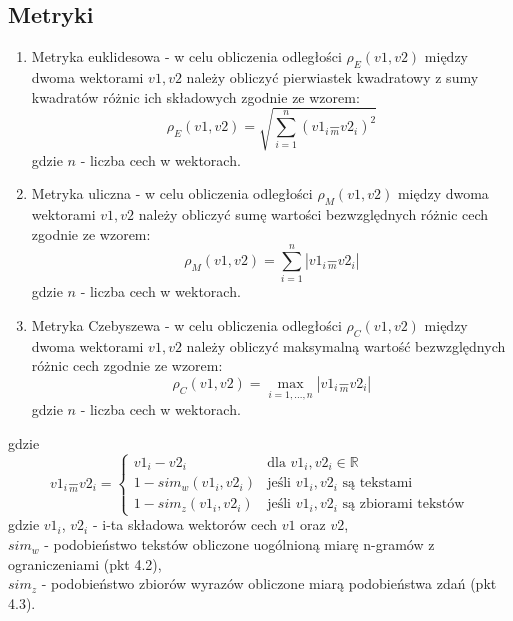\documentclass{article}
\begin{document}
\subsection{Metryki}
\begin{enumerate}
    \item Metryka euklidesowa - w celu obliczenia odległości \(\rho_E(v1, v2)\) między dwoma wektorami \(v1, v2\) należy obliczyć pierwiastek kwadratowy z sumy kwadratów różnic ich składowych zgodnie ze wzorem:
        \begin{equation}
      \rho_E(v1, v2) = \sqrt{\sum_{i=1}^{n} (v1_i \underset{m}{-} v2_i)^2}  
        \end{equation}
        gdzie \(n\) - liczba cech w wektorach.
        
    \item Metryka uliczna - w celu obliczenia odległości \(\rho_M(v1, v2)\) między dwoma wektorami \(v1, v2\) należy obliczyć sumę wartości bezwzględnych różnic cech zgodnie ze wzorem:
        \begin{equation}
          \rho_M(v1, v2) = \sum_{i=1}^{n} |v1_i \underset{m}{-} v2_i|
        \end{equation}
        gdzie \(n\) - liczba cech w wektorach.
        
    \item Metryka Czebyszewa - w celu obliczenia odległości \(\rho_C(v1, v2)\) między dwoma wektorami \(v1, v2\) należy obliczyć maksymalną wartość bezwzględnych różnic cech zgodnie ze wzorem:
        \begin{equation}
          \rho_C(v1, v2) = \max_{i = 1,...,n} |v1_i \underset{m}{-} v2_i|
        \end{equation}
        gdzie \(n\) - liczba cech w wektorach.
\end{enumerate}
gdzie 
\[
    v1_i \underset{m}{-} v2_i = 
    \begin{cases}
    v1_i - v2_i & \text{dla } v1_i, v2_i \in \mathbb{R} \\
    1 - sim_w(v1_i, v2_i) & \text{jeśli } v1_i, v2_i \text{ są tekstami}\\
    1 - sim_z(v1_i, v2_i) & \text{jeśli } v1_i, v2_i \text{ są zbiorami tekstów}
    \end{cases}
\]
gdzie \(v1_i\), \(v2_i\) - i-ta składowa wektorów cech \(v1\) oraz \(v2\),\\ \(sim_w\) - podobieństwo tekstów obliczone uogólnioną miarę n-gramów z ograniczeniami (pkt 4.2),\\ \(sim_z\) - podobieństwo zbiorów wyrazów obliczone miarą podobieństwa zdań (pkt 4.3). \\
\end{document}
